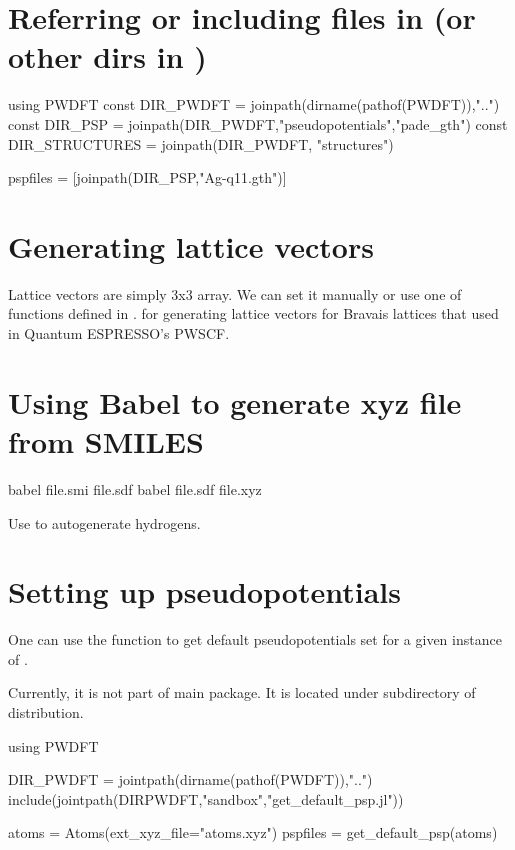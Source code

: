 \section{Referring or including files in  (or other dirs in )}

\begin{juliacode}
using PWDFT
const DIR_PWDFT = joinpath(dirname(pathof(PWDFT)),"..")
const DIR_PSP = joinpath(DIR_PWDFT,"pseudopotentials","pade_gth")
const DIR_STRUCTURES = joinpath(DIR_PWDFT, "structures")

pspfiles = [joinpath(DIR_PSP,"Ag-q11.gth")]
\end{juliacode}


\section{Generating lattice vectors}

Lattice vectors are simply 3x3 array. We can set it manually or use
one of functions defined in .
for generating lattice vectors for Bravais lattices that used
in Quantum ESPRESSO's PWSCF.

\section{Using Babel to generate xyz file from SMILES}

\begin{textcode}
babel file.smi file.sdf
babel file.sdf file.xyz
\end{textcode}

Use  to autogenerate hydrogens.



\section{Setting up pseudopotentials}

One can use the function  to get default
pseudopotentials set for a given instance of .

Currently, it is not part of main  package. It is located
under  subdirectory of  distribution.

\begin{juliacode}
using PWDFT

DIR_PWDFT = jointpath(dirname(pathof(PWDFT)),"..")
include(jointpath(DIRPWDFT,"sandbox","get_default_psp.jl"))

atoms = Atoms(ext_xyz_file="atoms.xyz")
pspfiles = get_default_psp(atoms)
\end{juliacode}

